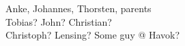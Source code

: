 \documentclass[thesis.tex]{subfiles}
\begin{document}
\label{chap:acknowledgements}

Anke, Johannes, Thorsten, parents\\
Tobias? John? Christian?\\
Christoph? Lensing? Some guy @ Havok?

\newpage
\end{document}
